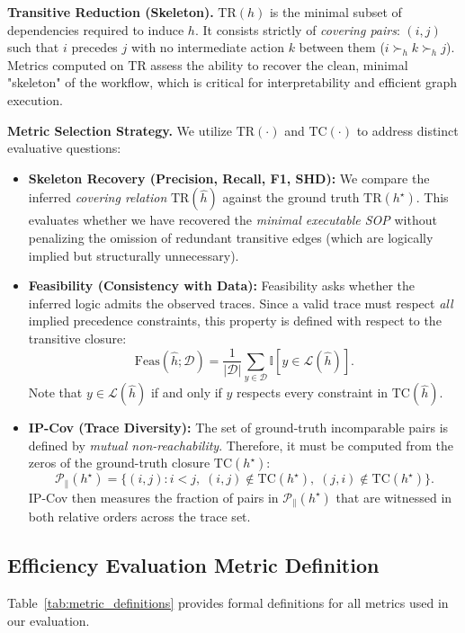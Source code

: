 \documentclass{article}
\theoremstyle{plain}
\theoremstyle{definition}
\theoremstyle{remark}
\begin{document}
\noindent \textbf{Transitive Reduction (Skeleton).}
$\mathrm{TR}(h)$ is the minimal subset of dependencies required to induce $h$. It consists strictly of \emph{covering pairs}: $(i,j)$ such that $i$ precedes $j$ with no intermediate action $k$ between them ($i \succ_h k \succ_h j$). Metrics computed on $\mathrm{TR}$ assess the ability to recover the clean, minimal "skeleton" of the workflow, which is critical for interpretability and efficient graph execution.

\noindent \textbf{Metric Selection Strategy.}
We utilize $\mathrm{TR}(\cdot)$ and $\mathrm{TC}(\cdot)$ to address distinct evaluative questions:

\begin{itemize}
    \item \textbf{Skeleton Recovery (Precision, Recall, F1, SHD):} 
    We compare the inferred \emph{covering relation} $\mathrm{TR}(\widehat{h})$ against the ground truth $\mathrm{TR}(h^\star)$. This evaluates whether we have recovered the \emph{minimal executable SOP} without penalizing the omission of redundant transitive edges (which are logically implied but structurally unnecessary).

    \item \textbf{Feasibility (Consistency with Data):}
    Feasibility asks whether the inferred logic admits the observed traces. Since a valid trace must respect \emph{all} implied precedence constraints, this property is defined with respect to the transitive closure:
    \[
    \mathrm{Feas}(\widehat{h}; \mathcal{D}) = \frac{1}{|\mathcal{D}|}
    \sum_{y \in \mathcal{D}} \mathbb{I}\left[ y \in \mathcal{L}(\widehat{h}) \right].
    \]
    Note that $y \in \mathcal{L}(\widehat{h})$ if and only if $y$ respects every constraint in $\mathrm{TC}(\widehat{h})$.

    \item \textbf{IP-Cov (Trace Diversity):}
    The set of ground-truth incomparable pairs is defined by \emph{mutual non-reachability}. Therefore, it must be computed from the zeros of the ground-truth closure $\mathrm{TC}(h^\star)$:
    \[
    \mathcal{P}_{\parallel}(h^\star) = \{(i,j) : i < j,\; (i,j) \notin \mathrm{TC}(h^\star),\; (j,i) \notin \mathrm{TC}(h^\star)\}.
    \]
    IP-Cov then measures the fraction of pairs in $\mathcal{P}_{\parallel}(h^\star)$ that are witnessed in both relative orders across the trace set.
\end{itemize}

\subsection{Efficiency Evaluation Metric Definition}
Table~\ref{tab:metric_definitions} provides formal definitions for all metrics 
used in our evaluation.
\end{document}
